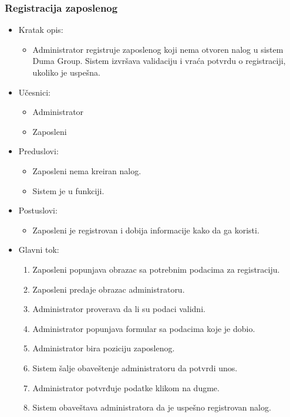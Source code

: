 \documentclass[a4paper]{article}
\begin{document}
\subsubsection{Registracija zaposlenog}

\begin{itemize}
    \item Kratak opis: 
    \begin{itemize}
        \item Administrator registruje zaposlenog koji nema otvoren nalog u sistem Duma Group. Sistem izvršava validaciju i vraća potvrdu o registraciji, ukoliko je uspešna.
    \end{itemize}
    \item Učesnici:
        \begin{itemize}
        \item Administrator
        \item Zaposleni
    \end{itemize}
    \item Preduslovi:
        \begin{itemize}
            \item Zaposleni nema kreiran nalog.
            \item Sistem je u funkciji.
        \end{itemize}
    \item Postuslovi:
        \begin{itemize}
            \item Zaposleni je registrovan i dobija informacije kako da ga koristi.
        \end{itemize}
    \item Glavni tok:
        \begin{enumerate}
            \item Zaposleni popunjava obrazac sa potrebnim podacima za registraciju.
            \item Zaposleni predaje obrazac administratoru.
            \item Administrator proverava da li su podaci validni.
            \item Administrator popunjava formular sa podacima koje je dobio.
            \item Administrator bira poziciju zaposlenog.
            \item Sistem šalje obaveštenje administratoru da potvrdi unos.
            \item Administrator potvrđuje podatke klikom na dugme.
            \item Sistem obaveštava administratora da je uspešno registrovan nalog.

\end{enumerate}
\end{itemize}
\end{document}

